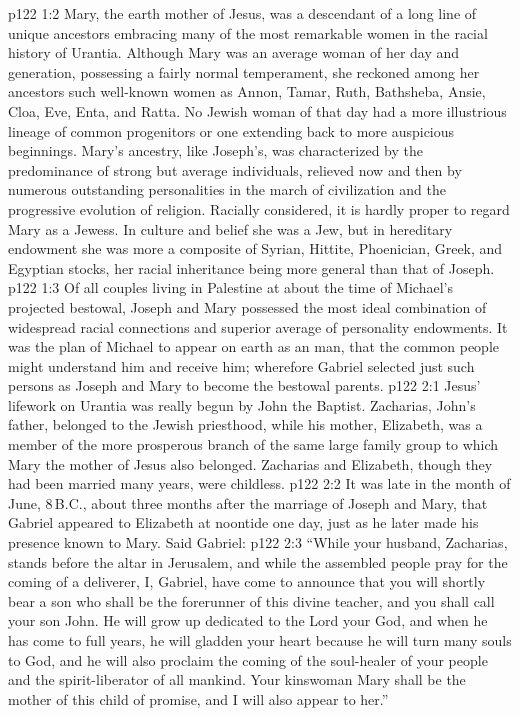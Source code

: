 \vs p122 1:2 Mary, the earth mother of Jesus, was a descendant of a long line of unique ancestors embracing many of the most remarkable women in the racial history of Urantia. Although Mary was an average woman of her day and generation, possessing a fairly normal temperament, she reckoned among her ancestors such well\hyp{}known women as Annon, Tamar, Ruth, Bathsheba, Ansie, Cloa, Eve, Enta, and Ratta. No Jewish woman of that day had a more illustrious lineage of common progenitors or one extending back to more auspicious beginnings. Mary’s ancestry, like Joseph’s, was characterized by the predominance of strong but average individuals, relieved now and then by numerous outstanding personalities in the march of civilization and the progressive evolution of religion. Racially considered, it is hardly proper to regard Mary as a Jewess. In culture and belief she was a Jew, but in hereditary endowment she was more a composite of Syrian, Hittite, Phoenician, Greek, and Egyptian stocks, her racial inheritance being more general than that of Joseph.
\vs p122 1:3 Of all couples living in Palestine at about the time of Michael’s projected bestowal, Joseph and Mary possessed the most ideal combination of widespread racial connections and superior average of personality endowments. It was the plan of Michael to appear on earth as an  man, that the common people might understand him and receive him; wherefore Gabriel selected just such persons as Joseph and Mary to become the bestowal parents.
\vs p122 2:1 Jesus’ lifework on Urantia was really begun by John the Baptist. Zacharias, John’s father, belonged to the Jewish priesthood, while his mother, Elizabeth, was a member of the more prosperous branch of the same large family group to which Mary the mother of Jesus also belonged. Zacharias and Elizabeth, though they had been married many years, were childless.
\vs p122 2:2 \pc It was late in the month of June, 8\,B.C., about three months after the marriage of Joseph and Mary, that Gabriel appeared to Elizabeth at noontide one day, just as he later made his presence known to Mary. Said Gabriel:
\vs p122 2:3 “While your husband, Zacharias, stands before the altar in Jerusalem, and while the assembled people pray for the coming of a deliverer, I, Gabriel, have come to announce that you will shortly bear a son who shall be the forerunner of this divine teacher, and you shall call your son John. He will grow up dedicated to the Lord your God, and when he has come to full years, he will gladden your heart because he will turn many souls to God, and he will also proclaim the coming of the soul\hyp{}healer of your people and the spirit\hyp{}liberator of all mankind. Your kinswoman Mary shall be the mother of this child of promise, and I will also appear to her.”
